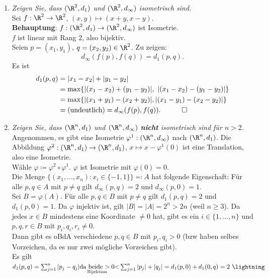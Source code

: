 \begin{problem*}[4]
  \begin{enumerate}
    \item \emph{Zeigen Sie, dass $ (\R^2, d_1) $ und $ (\R^2, d_\infty) $ isometrisch sind.} \\
      Sei $ f : \R^2 \to \R^2 $, $ (x,y) \mapsto (x+y, x-y) $. \\
      \textbf{Behauptung}: $ f : (\R^2, d_1) \to (\R^2, d_\infty) $ ist Isometrie. \\
      $ f $ ist linear mit Rang $ 2 $, also bijektiv. \\
      Seien $ p = (x_1, y_1) $, $ q = (x_2, y_2) \in \R^2 $. Zu zeigen:
      \begin{equation*}
        d_\infty(f(p),f(q)) = d_1(p,q)\text{.}
      \end{equation*}
      Es ist
      \begin{align*}
        d_1(p,q) &= \vert x_1 - x_2 \vert + \vert y_1 - y_2 \vert \\
          &= \max\{ \vert (x_1-x_2) + (y_1-y_2) \vert, \ \vert (x_1 - x_2) - (y_1-y_2) \vert \} \\
          &= \max\{ \vert (x_1 + y_1) - (x_2+y_2) \vert, \vert (x_1-y_1)-(x_2-y_2) \vert \} \\
          &= \text{(undeutlich)} = d_\infty(f(p),f(q))\text{.} \quad \qed
      \end{align*}
    \item \emph{Zeigen Sie, dass $ (\R^n, d_1) $ und $ (\R^n, d_\infty) $ \textbf{nicht} isometrisch sind für $ n > 2 $.} \\
    Angenommen, es gibt eine Isometrie $ \varphi^1: (\R^n, d_\infty) $ nach $ (\R^n, d_1) $. Die Abbildung $ \varphi^2 : (\R^n, d_1) \to (\R^n, d_1) $, $ x \mapsto x - \varphi^1(0) $ ist eine Translation, also eine Isometrie. \\
    Wähle $ \varphi \coloneqq \varphi^2 \circ \varphi^1 $. $ \varphi $ ist Isometrie mit $ \varphi(0) = 0 $. \\
    Die Menge $ \{ (x_1, \dots, x_n) : x_i \in \{ -1, 1 \} \} \eqqcolon A $ hat folgende Eigenschaft: Für alle $ p, q \in A $ mit $ p \neq q $ gilt $ d_\infty(p,q) = 2 $ und $ d_\infty(p, 0) = 1 $. \\
    Sei $ B = \varphi(A) $. Für alle $ p,q \in B $ mit $ p \neq q $ gilt $ d_1(p,q) = 2 $ und $ d_1(p,0) = 1 $. Da $ \varphi $ injektiv ist, gilt $ \vert B \vert = \vert A \vert = 2^n > 2n $ (weil $ n \geq 3 $). Da jedes $ x \in B $ mindestens eine Koordinate $ \neq 0 $ hat, gibt es ein $ i \in \{ 1, \dots, n \} $ und $ p,q,r \in B $ mit $ p_i, q_i, r_i \neq 0 $. \\
    Dann gibt es oBdA verschiedene $ p,q \in B $ mit $ p_i, q_i > 0 $ (bzw haben selbes Vorzeichen, da es nur zwei mögliche Vorzeichen gibt). \\
    Es gilt $ d_1(p,q) = \sum_{j = 1}^n \vert p_j - q_j \vert \underset{\text{Bijektion}}{\text{da beide $ > 0 $}}{<} \sum_{j = 1}^n \vert p_j \vert + \vert q_j \vert = d_1(p,0) + d_1(0,q) = 2 \ \lightning $
  \end{enumerate}
\end{problem*}
